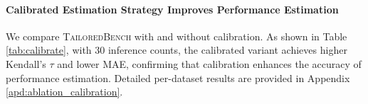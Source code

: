 
\paragraph{Calibrated Estimation Strategy Improves Performance Estimation} 
We compare \textsc{TailoredBench} with and without calibration. As shown in Table \ref{tab:calibrate}, with 30 inference counts, the calibrated variant achieves higher Kendall’s $\tau$ and lower MAE, confirming that calibration enhances the accuracy of performance estimation. Detailed per-dataset results are provided in Appendix \ref{apd:ablation_calibration}.

